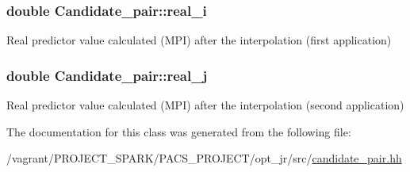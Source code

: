 \hypertarget{classCandidate__pair_a8ac003373540c4149eaa8db2392921e0}{
\subsubsection[{real\-\_\-i}]{\setlength{\rightskip}{0pt plus 5cm}double Candidate\-\_\-pair\-::real\-\_\-i\hspace{0.3cm}{\ttfamily [private]}}}\label{classCandidate__pair_a8ac003373540c4149eaa8db2392921e0}


Real predictor value calculated (M\-P\-I) after the interpolation (first application) 

\hypertarget{classCandidate__pair_ad1096cd9230ebca7f706981dee48794c}{
\subsubsection[{real\-\_\-j}]{\setlength{\rightskip}{0pt plus 5cm}double Candidate\-\_\-pair\-::real\-\_\-j\hspace{0.3cm}{\ttfamily [private]}}}\label{classCandidate__pair_ad1096cd9230ebca7f706981dee48794c}


Real predictor value calculated (M\-P\-I) after the interpolation (second application) 



The documentation for this class was generated from the following file\-:\begin{DoxyCompactItemize}
\item 
/vagrant/\-P\-R\-O\-J\-E\-C\-T\-\_\-\-S\-P\-A\-R\-K/\-P\-A\-C\-S\-\_\-\-P\-R\-O\-J\-E\-C\-T/opt\-\_\-jr/src/\hyperlink{candidate__pair_8hh}{candidate\-\_\-pair.\-hh}\end{DoxyCompactItemize}
